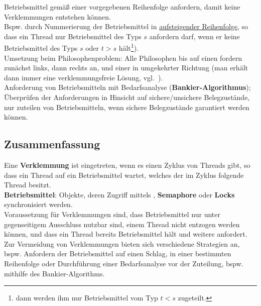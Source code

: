 \noindent
Betriebsmittel gemäß einer vorgegebenen Reihenfolge anfordern, damit keine Verklemmungen entstehen können.\\
Bspw. durch Nummerierung der Betriebsmittel in \ul{aufsteigender Reihenfolge}, so dass ein Thread nur Betriebsmittel des Typs $s$ anfordern darf, wenn er keine Betriebsmittel des Typs $s$ oder $t > s$ hält\footnote{
    dann werden ihm nur Betriebsmittel vom Typ $t < s$ zugeteilt.
}).\\
Umsetzung beim Philosophenproblem: Alle Philosophen bis auf einen fordern zunächst links, dann rechts an, und einer in umgekehrter Richtung (man erhält dann immer eine verklemmungsfreie Lösung, vgl.~\cite[197]{Oec22}).\\

\noindent
Anforderung von Betriebsmitteln mit Bedarfsanalyse (\textbf{Bankier-Algorithmus}); Überprüfen der Anforderungen in Hinsicht auf sichere/unsichere Belegzustände, nur zuteilen von Betriebsmitteln, wenn sichere Belegzustände garantiert werden können.


\subsection{Zusammenfassung}
Eine \textbf{Verklemmung} ist eingetreten, wenn es einen Zyklus von Threads gibt, so dass ein Thread auf ein Betriebsmittel wartet, welches der im Zyklus folgende Thread besitzt.\\

\noindent
\textbf{Betriebsmittel}: Objekte, deren Zugriff mittels , \textbf{Semaphore} oder \textbf{Locks} synchronisiert werden.\\

\noindent
Voraussetzung für Verklemmungen sind, dass Betriebsmittel nur unter gegenseitigem Ausschluss nutzbar sind, einem Thread nicht entzogen werden können, und dass ein Thread bereits Betriebsmittel hält und weitere anfordert.\\

\noindent
Zur Vermeidung von Verklemmungen bieten sich verschiedene Strategien an, {bspw.} Anfordern der Betriebsmittel auf einen Schlag, in einer bestimmten Reihenfolge oder Durchführung einer Bedarfsanalyse vor der Zuteilung, {bspw.} mithilfe des Bankier-Algorithms.
